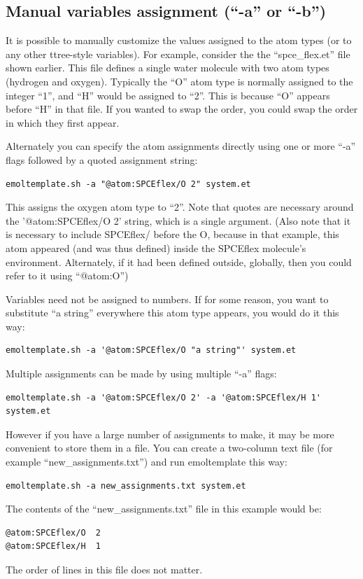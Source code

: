 \documentclass[11pt]{article}
\begin{document}
\subsection{Manual variables assignment (``-a'' or ``-b'')}
\label{sec:manual_assignment}

It is possible to manually customize the values assigned 
to the atom types (or to any other ttree-style variables).
For example, consider the the ``spce\_flex.et'' file shown earlier.
This file defines a single water molecule with two atom types
(hydrogen and oxygen).
Typically the ``O'' atom type is normally assigned to the integer ``1'',
and ``H'' would be assigned to ``2''.
This is because ``O'' appears before ``H'' in that file.
If you wanted to swap the order, you could swap the order
in which they first appear.

Alternately you can specify the atom assignments directly 
using one or more ``-a'' flags followed by a quoted assignment string:
\begin{verbatim}
emoltemplate.sh -a "@atom:SPCEflex/O 2" system.et
\end{verbatim}
This assigns the oxygen atom type to ``2''.
Note that quotes are necessary around the '@atom:SPCEflex/O 2' string, 
which is a single argument.
(Also note that it is necessary to include SPCEflex/ before 
 the O, 
 because in that example, 
 this atom
 appeared (and 
 was
 thus defined) inside the SPCEflex molecule's environment.
 Alternately, if 
 it
 had been defined outside, globally, 
 then you could refer to 
 it
 using 
 ``@atom:O'')

Variables need not be assigned to numbers.
If for some reason, you want to substitute ``a string'' everywhere 
this atom type appears, you would do it this way:
\begin{verbatim}
emoltemplate.sh -a '@atom:SPCEflex/O "a string"' system.et
\end{verbatim}

Multiple assignments can be made by using multiple ``-a'' flags:
\begin{verbatim}
emoltemplate.sh -a '@atom:SPCEflex/O 2' -a '@atom:SPCEflex/H 1' system.et
\end{verbatim}
However if you have a large number of assignments to make, 
it may be more convenient to store them in a file.  
You can create a two-column text file (for example ``new\_assignments.txt'')
and run emoltemplate this way:
\begin{verbatim}
emoltemplate.sh -a new_assignments.txt system.et
\end{verbatim}
The contents of the ``new\_assignments.txt'' file in this example would be:
\begin{verbatim}
@atom:SPCEflex/O  2
@atom:SPCEflex/H  1
\end{verbatim}
The order of lines in this file does not matter.
\end{document}
